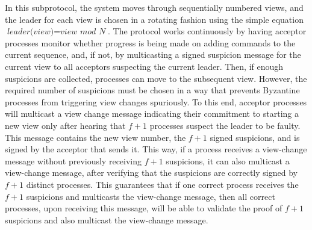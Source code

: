 In this subprotocol, the system moves through sequentially numbered views, and the leader for each view is chosen in a rotating fashion using the simple equation $\textit{leader(view)}=\textit{view mod N}$. The protocol works continuously by having acceptor processes monitor whether progress is being made on adding commands to the current sequence, and, if not, by multicasting a signed {\sc suspicion} message for the current view to all acceptors suspecting the current leader. Then, if enough suspicions are collected, processes can move to the subsequent view. However, the required number of suspicions must be chosen in a way that prevents Byzantine processes from triggering view changes spuriously. To this end, acceptor processes will multicast a view change message indicating their commitment to starting a new view only after hearing that $f+1$ processes suspect the leader to be faulty. This message contains the new view number, the $f+1$ signed suspicions, and is signed by the acceptor that sends it. This way, if a process receives a view-change message without previously receiving $f+1$ suspicions, it can also multicast a view-change message, after verifying that the suspicions are correctly signed by $f+1$ distinct processes.
This guarantees that if one correct process receives the $f+1$ suspicions and multicasts the view-change message, then all correct processes, upon receiving this message, will be able to validate the proof of $f+1$ suspicions and also multicast the view-change message.\par

